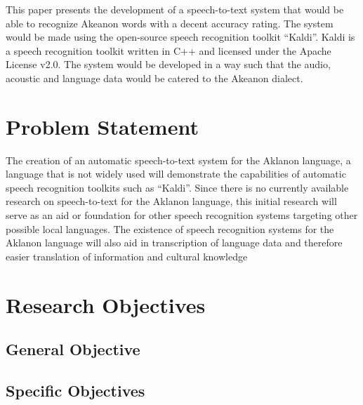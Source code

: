 This paper presents the development of a speech-to-text system that would be able to recognize Akeanon words with a decent accuracy rating. The system would be made using the open-source speech recognition toolkit “Kaldi”. Kaldi is a speech recognition toolkit written in C++ and licensed under the Apache License v2.0. The system would be developed in a way such that the audio, acoustic and language data would be catered to the Akeanon dialect.


\section{Problem Statement}

The creation of an automatic speech-to-text system for the Aklanon language, a language that is not widely used will demonstrate the capabilities of automatic speech recognition toolkits such as “Kaldi”.  Since there is no currently available research on speech-to-text for the Aklanon language, this initial research will serve as an aid or foundation for other speech recognition systems targeting other possible local languages. The existence of speech recognition systems for the Aklanon language will also aid in transcription of language data and therefore easier translation of information and cultural knowledge

\section{Research Objectives}
\label{sec:researchobjectives}

\subsection{General Objective}
\label{sec:generalobjective}


\subsection{Specific Objectives}
\label{sec:specificobjectives}



